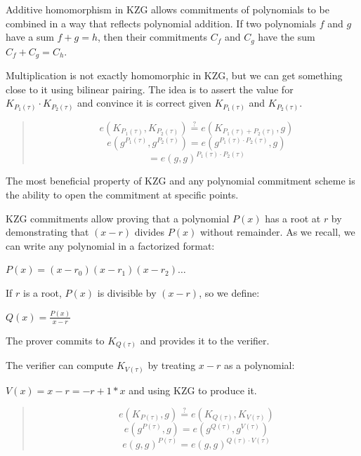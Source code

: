 Additive homomorphism in KZG allows commitments of polynomials to be combined in a way that reflects polynomial addition. 
If two polynomials $f$ and $g$ have a sum $f + g = h$, then their commitments $C_f$ and $C_g$ have the sum $C_f + C_g = C_h$.

Multiplication is not exactly homomorphic in KZG, but we can get something close to it using bilinear pairing.
The idea is to assert the value for $K_{P_1(\tau)} \cdot K_{P_2(\tau)}$ and convince it is correct given $K_{P_1(\tau)}$ and $K_{P_2(\tau)}$.

\begin{quote}
   \begin{equation*}
 e(K_{P_1(\tau)}, K_{P_2(\tau)}) \stackrel{?}{=} e(K_{P_1(\tau) + P_2(\tau)}, g)
   \end{equation*}
   \begin{equation*}
 e(g^{P_1(\tau)}, g^{P_2(\tau)}) = e(g^{P_1(\tau) \cdot P_2(\tau)}, g)
   \end{equation*}
   \begin{equation*}
 = e(g, g)^{P_1(\tau) \cdot P_2(\tau)}
   \end{equation*}
\end{quote}
   


The most beneficial property of KZG and any polynomial commitment scheme is the ability to open the commitment at specific points.

KZG commitments allow proving that a polynomial \( P(x) \) has a root at \( r \) by demonstrating that \( (x - r) \) divides \( P(x) \) without remainder.
As we recall, we can write any polynomial in a factorized format:

$P(x) = (x - r_0)(x - r_1)(x - r_2) \dots$

If \( r \) is a root, \( P(x) \) is divisible by \( (x - r) \), so we define:

$Q(x) = \frac{P(x)}{x - r}$

The prover commits to \( K_{Q(\tau)} \) and provides it to the verifier.

The verifier can compute $K_{V(\tau)}$ by treating $x-r$ as a polynomial:

$V(x) = x - r = -r + 1 * x$
and using KZG to produce it.
\begin{quote}
   \begin{equation*}
 e(K_{P(\tau)}, g) \stackrel{?}{=} e(K_{Q(\tau)}, K_{V(\tau)})
   \end{equation*}
   \begin{equation*}
 e(g^{P(\tau)}, g) = e(g^{Q(\tau)}, g^{V(\tau)})
   \end{equation*}
   \begin{equation*}
 e(g, g)^{P(\tau)} = e(g, g)^{Q(\tau) \cdot V(\tau)}
   \end{equation*}
\end{quote}


